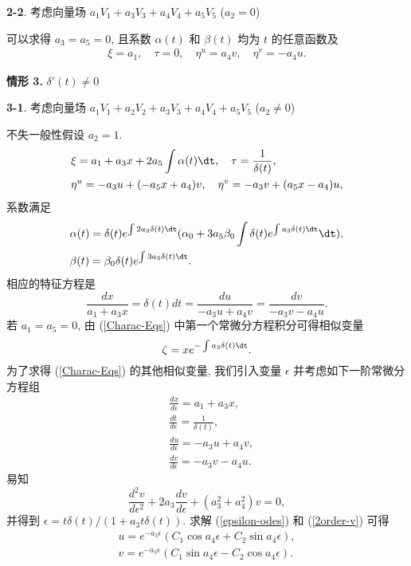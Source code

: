 \textbf{2-2}. 考虑向量场 $a_1 V_1+a_3 V_3+a_4 V_4+a_5 V_5$ ($a_2= 0$)

可以求得 $a_3=a_5=0$, 且系数 $\alpha(t)$ 和 $\beta(t)$ 均为 $t$ 的任意函数及
\begin{align*}
\xi=a_1,\quad \tau=0,\quad \eta^u=a_4v,\quad \eta^v=-a_4u.
\end{align*}

\noindent \textbf{情形 3.} $\delta'(t)\neq 0$

\textbf{3-1}. 考虑向量场 $a_1 V_1+a_2 V_2+a_3 V_3+a_4 V_4+a_5 V_5$ ($a_2\neq 0$)

不失一般性假设 $a_2=1$.
\begin{align*}
&\xi=a_1+a_3x+2a_5\int\alpha(t)\dt,\quad \tau=\frac{1}{\delta(t)},\\
&\eta^u=-a_3u+(-a_5x+a_4)v,\quad \eta^v=-a_3v+(a_5x-a_4)u,
\end{align*}
系数满足
\begin{align*}
&\alpha(t)=\delta(t)e^{\int2a_3\delta(t)\dt} (\alpha_0+3a_5\beta_0\int\delta(t)e^{\int a_3\delta(t)\dt}\dt),\notag\\ &\beta(t)=\beta_0\delta(t)e^{\int3a_3\delta(t)\dt}.
\end{align*}
相应的特征方程是
\begin{equation}\label{Charac-Eqs}
\frac{dx}{a_1+a_3x}=\delta(t)dt=\frac{du}{-a_3u+a_4v}=\frac{dv}{-a_3v-a_4u}.
\end{equation}
若 $a_1=a_5=0$, 由 (\ref{Charac-Eqs}) 中第一个常微分方程积分可得相似变量
\begin{equation}
\zeta=xe^{-\int a_3\delta(t)\dt}.
\end{equation}
为了求得 (\ref{Charac-Eqs}) 的其他相似变量, 我们引入变量 $\epsilon$ 并考虑如下一阶常微分方程组
\begin{equation}\label{epsilon-odes}
\begin{aligned}
&\frac{dx}{d\epsilon}=a_1+a_3x,\\
&\frac{dt}{d\epsilon}=\frac{1}{\delta(t)},\\
&\frac{du}{d\epsilon}=-a_3u+a_4v,\\
&\frac{dv}{d\epsilon}=-a_3v-a_4u.
\end{aligned}
\end{equation}
易知
\begin{equation}\label{2order-v}
\frac{d^2v}{d\epsilon^2}+2a_3\frac{dv}{d\epsilon}+(a_3^2+a_4^2)v=0,
\end{equation}
并得到 $\epsilon=t\delta(t)/(1+a_3t\delta(t))$. 求解 (\ref{epsilon-odes}) 和 (\ref{2order-v}) 可得
\begin{equation}
\begin{aligned}
u=e^{-a_3\epsilon}(C_1\cos{a_4\epsilon}+C_2\sin{a_4\epsilon}),\\
v=e^{-a_3\epsilon}(C_1\sin{a_4\epsilon}-C_2\cos{a_4\epsilon}).
\end{aligned}
\end{equation}
